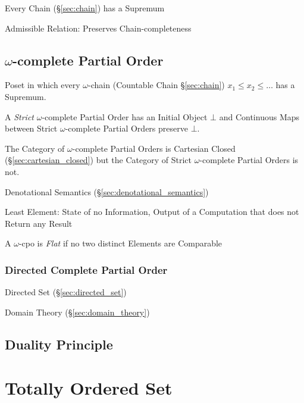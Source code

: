 Every Chain (\S\ref{sec:chain}) has a Supremum

Admissible Relation: Preserves Chain-completeness



\subsection{$\omega$-complete Partial Order}\label{sec:omega_cpo}

Poset in which every $\omega$-chain (Countable Chain
\S\ref{sec:chain}) $x_1 \leq x_2 \leq \ldots$ has a Supremum.

A \emph{Strict} $\omega$-complete Partial Order has an Initial Object
$\bot$ and Continuous Maps between Strict $\omega$-complete Partial
Orders preserve $\bot$.

The Category of $\omega$-complete Partial Orders is Cartesian Closed
(\S\ref{sec:cartesian_closed}) but the Category of Strict
$\omega$-complete Partial Orders is not.

Denotational Semantics (\S\ref{sec:denotational_semantics})

Least Element: State of no Information, Output of a Computation that
does not Return any Result

A $\omega$-cpo is \emph{Flat} if no two distinct Elements are
Comparable



\subsubsection{Directed Complete Partial Order}\label{sec:dcpo}

Directed Set (\S\ref{sec:directed_set})

Domain Theory (\S\ref{sec:domain_theory})



\subsection{Duality Principle}\label{sec:duality_principle}



\section{Totally Ordered Set}\label{sec:totally_ordered}


